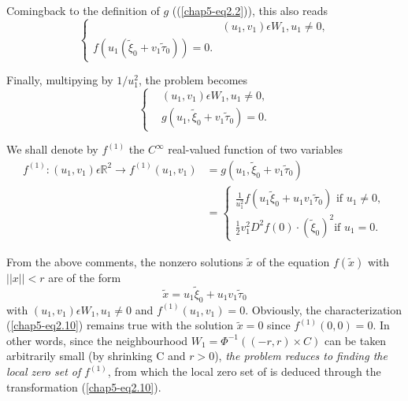 Coming\pageoriginale back to the definition of $g$
((\ref{chap5-eq2.2})), this also reads
\begin{equation*}
\begin{cases}
& (u_{1}, v_{1}) \epsilon W_{1}, u_{1} \neq 0,\\
f(u_{1}(\widetilde{\xi}_{0} + v_{1}\widetilde{\tau}_{0})) = 0.
\end{cases}
\end{equation*}

Finally, multipying by $1/u_{1}^{2}$, the problem becomes
\begin{equation*}
\begin{cases}
& (u_{1}, v_{1}) \epsilon W_{1}, u_{1} \neq 0,\\
& g(u_{1}, \widetilde{\xi}_{0} + v_{1}\widetilde{\tau}_{0}) = 0.
\end{cases}
\end{equation*}

We shall denote by $f^{(1)}$ the $C^{\infty}$ real-valued function of
two variables
\begin{align*}
f^{(1)} : (u_{1}, v_{1}) \epsilon \mathbb{R}^{2} \to f^{(1)}(u_{1},
v_{1}) &= g(u_{1}, \widetilde{\xi}_{0} + v_{1}
\widetilde{\tau}_{0})\\ 
&= \begin{cases}
\frac{1}{u_{1}^{2}} f(u_{1}\widetilde{\xi}_{0} + u_{1} v_{1}
\widetilde{\tau}_{0}) \text{ if } u_{1} \neq 0,\\
\frac{1}{2} v_{1}^{2} D^{2}f(0) \cdot (\widetilde{\xi}_{0})^{2} \text{
if } u_{1} = 0.
\end{cases}\tag{2.9}\label{chap5-eq2.9}
\end{align*}

From the above comments, the nonzero solutions $\widetilde{x}$ of the
equation $f(\widetilde{x})$ with $||x|| < r$ are of the form
\begin{equation*}
\widetilde{x} = u_{1}\widetilde{\xi}_{0} + u_{1}v_{1}\widetilde{\tau}_{0}\tag{2.10}\label{chap5-eq2.10}
\end{equation*}
with $(u_{1}, v_{1}) \epsilon W_{1}, u_{1} \neq 0$ and $f^{(1)}
(u_{1}, v_{1}) = 0$. Obviously, the characterization
(\ref{chap5-eq2.10}) remains true with the solution $\widetilde{x} =
0$ since $f^{(1)} (0, 0) = 0$. In other words, since the neighbourhood
$W_{1} = \Phi^{-1} ((-r, r) \times C)$ can be taken arbitrarily small
(by shrinking C and $r > 0$), {\em the problem reduces to finding the
  local zero set of} $f^{(1)}$, from which the local zero set of is
deduced through the transformation (\ref{chap5-eq2.10}).


